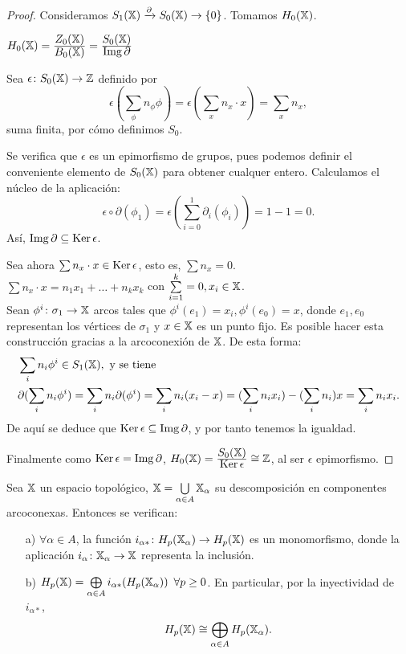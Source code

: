 \begin{proof}
  Consideramos $S_{1}({\mathbb X}) \xrightarrow{\partial} S_{0}({\mathbb X}) \to \{0\}$. Tomamos $H_0({\mathbb X})$.

  $H_0({\mathbb X}) = \frac{\displaystyle Z_0({\mathbb X})}{\displaystyle B_0({\mathbb X})} = \frac{\displaystyle S_0({\mathbb X})}{\displaystyle \operatorname{Img} \partial}$

  Sea $\epsilon \colon S_0({\mathbb X}) \to \mathbb{Z}$ definido por \[\epsilon(\sum\limits_{\phi} n_\phi \phi) = \epsilon(\sum\limits_{x} n_x \cdot x) = \sum\limits_{x} n_x, \]
  suma finita, por cómo definimos $S_0$.

  Se verifica que $\epsilon$ es un epimorfismo de grupos, pues podemos definir el conveniente elemento de $S_0({\mathbb X})$ para obtener
  cualquer entero. Calculamos el núcleo de la aplicación:
  \[ \epsilon \circ \partial(\phi_1) = \epsilon(\sum_{i=0}^1 \partial_i(\phi_i)) = 1 - 1 = 0.\]
  Así, $\operatorname{Img} \partial \subseteq \operatorname{Ker} \epsilon$.

  Sea ahora $\sum n_x \cdot x \in \operatorname{Ker} \epsilon$, esto es, $\sum n_x = 0$. \\
  $\sum n_x \cdot x = n_1 x_1 + \dots + n_k x_k$ con $\sum\limits_{i=1}^k = 0, x_i \in {\mathbb X}$. \\
  Sean $\phi^i \colon \sigma_1 \to {\mathbb X}$ arcos tales que $\phi^i(e_1) = x_i, \phi^i(e_0) = x$,
  donde $e_1, e_0$ representan los vértices de $\sigma_1$ y $x \in {\mathbb X}$ es un punto fijo.
  Es posible hacer esta construcción gracias a la arcoconexión de ${\mathbb X}$. De esta forma:
  \begin{align*}
    &\sum_i n_i \phi^i \in S_{1}({\mathbb X}), \text{ y se tiene} \\
    &\partial(\sum_i n_i \phi^i) = \sum_i n_i \partial(\phi^i) = \sum_i n_i(x_i - x) = (\sum_i n_i x_i) - (\sum_i n_i) x = \sum_i n_i x_i.
  \end{align*}
  De aquí se deduce que $\operatorname{Ker} \epsilon \subseteq \operatorname{Img} \partial$, y por tanto tenemos la igualdad.

  Finalmente como $\operatorname{Ker} \epsilon = \operatorname{Img} \partial$, $H_0({\mathbb X}) = \frac{\displaystyle S_0({\mathbb X})}{\displaystyle \operatorname{Ker} \epsilon} \cong \mathbb{Z}$, al ser $\epsilon$ epimorfismo.
\end{proof}

\begin{proposition}
  Sea ${\mathbb X}$ un espacio topológico, ${\mathbb X} = \bigcup\limits_{\alpha \in A} {\mathbb X}_\alpha$ su descomposición en componentes arcoconexas. Entonces se verifican:
  \begin{itemize}
    \item[a)] $\forall \alpha \in A$, la función $i_{\alpha*} \colon H_p({\mathbb X}_\alpha) \to H_p({\mathbb X})$ es un monomorfismo, donde la aplicación
              $i_\alpha \colon {\mathbb X}_\alpha \to {\mathbb X}$ representa la inclusión.
    \item[b)] $H_p({\mathbb X}) = \bigoplus\limits_{\alpha \in A} i_{\alpha*}(H_p({\mathbb X}_\alpha)) \hspace{0.5em} \forall p \geq 0$. En particular, por la inyectividad de $i_{\alpha*}$,
              \[ H_p({\mathbb X}) \cong \bigoplus_{\alpha \in A} H_p({\mathbb X}_\alpha). \]
  \end{itemize}
\end{proposition}

